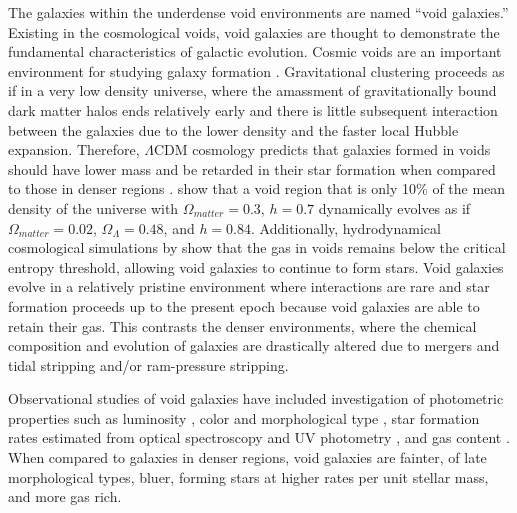The galaxies within the underdense void environments are named ``void 
galaxies.''  Existing in the cosmological voids, void galaxies are thought to 
demonstrate the fundamental characteristics of galactic evolution.  Cosmic voids 
are an important environment for studying galaxy formation \citep[see][for a 
review]{vandeWeygaert11}.  Gravitational clustering proceeds as if in a very low 
density universe, where the amassment of gravitationally bound dark matter halos 
ends relatively early and there is little subsequent interaction between the 
galaxies due to the lower density and the faster local Hubble expansion.  
Therefore, $\Lambda$CDM cosmology predicts that galaxies formed in voids should 
have lower mass and be retarded in their star formation when compared to those 
in denser regions \cite[e.g.,][]{Gottlober03,Goldberg05,Cen11}.  
\cite{Goldberg04} show that a void region that is only 10\% of the mean density 
of the universe with $\Omega_{matter} = 0.3$, $h = 0.7$ dynamically evolves as 
if $\Omega_{matter} = 0.02$, $\Omega_\Lambda = 0.48$, and $h = 0.84$.  
Additionally, hydrodynamical cosmological simulations by \cite{Cen11} show that 
the gas in voids remains below the critical entropy threshold, allowing void 
galaxies to continue to form stars.  Void galaxies evolve in a relatively 
pristine environment where interactions are rare and star formation proceeds up 
to the present epoch because void galaxies are able to retain their gas.  This 
contrasts the denser environments, where the chemical composition and evolution 
of galaxies are drastically altered due to mergers and tidal stripping and/or 
ram-pressure stripping.

Observational studies of void galaxies have included investigation of 
photometric properties such as luminosity \citep{Hoyle05,Croton05,Moorman15}, 
color and morphological type \citep{Grogin00,Rojas04,Patiri06,Park07,
vonBendaBeckmann08,Hoyle12}, star formation rates estimated from optical 
spectroscopy and UV photometry \citep{Rojas05,Moorman15,Beygu16}, and gas 
content \citep{Kreckel12,Moorman16,Jones16}.  When compared to galaxies in 
denser regions, void galaxies are fainter, of late morphological types, bluer, 
forming stars at higher rates per unit stellar mass, and more gas rich.

